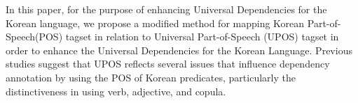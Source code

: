 In this paper, for the purpose of enhancing Universal Dependencies for the Korean language, we propose a modified method for mapping Korean Part-of-Speech(POS) tagset in relation to Universal Part-of-Speech (UPOS) tagset in order to enhance the Universal Dependencies for the Korean Language. Previous studies suggest that UPOS reflects several issues that influence dependency annotation by using the POS of Korean predicates, particularly the distinctiveness in using verb, adjective, and copula.
